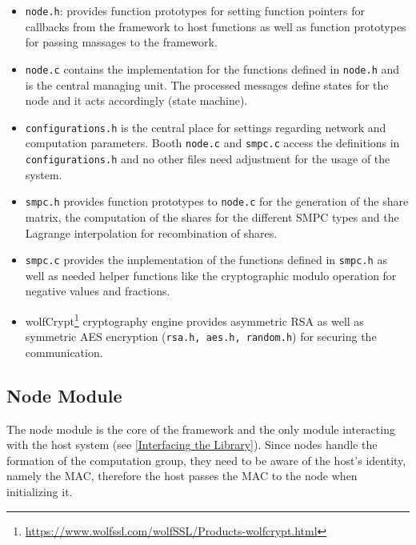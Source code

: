 \begin{itemize}
	\item \lstinline|node.h|: provides function prototypes for setting function pointers for callbacks from the framework to host functions as well as function prototypes for passing massages to the framework.
	\item \lstinline|node.c| contains the implementation for the functions defined in \lstinline|node.h| and is the central managing unit. The processed messages define states for the node and it acts accordingly (state machine).
	\item \lstinline|configurations.h| is the central place for settings regarding network and computation parameters. Booth \lstinline|node.c| and \lstinline|smpc.c| access the definitions in \lstinline|configurations.h| and no other files need adjustment for the usage of the system.
	\item \lstinline|smpc.h| provides function prototypes to \lstinline|node.c| for the generation of the share matrix, the computation of the shares for the different \gls{SMPC} types and the Lagrange interpolation for recombination of shares.
	\item \lstinline|smpc.c| provides the implementation of the functions defined in \lstinline|smpc.h| as well as needed helper functions like the cryptographic modulo operation for negative values and fractions.
	\item wolfCrypt\footnote{\url{https://www.wolfssl.com/wolfSSL/Products-wolfcrypt.html}} cryptography engine provides asymmetric \gls{RSA} as well as symmetric \gls{AES} encryption (\lstinline|rsa.h, aes.h, random.h|) for securing the communication.
\end{itemize}

\subsection{Node Module} \label{Node Module}

The node module is the core of the framework and the only module interacting with the host system (see \autoref{Interfacing the Library}). Since nodes handle the formation of the computation group, they need to be aware of the host's identity, namely the \gls{MAC}, therefore the host passes the \gls{MAC} to the node when initializing it.

